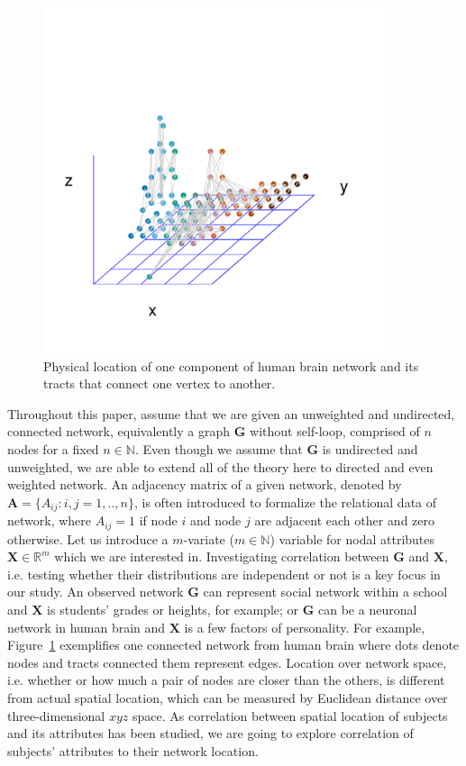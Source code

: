 \documentclass[12pt]{article}
\theoremstyle{definition}
\begin{document}
\begin{figure}[h]
	\centering
	\includegraphics[width=4in]{../Figure/intro.pdf}	
	\caption{Physical location of one component of human brain network and its tracts that connect one vertex to another.}
	\label{fig:intro}
\end{figure}

Throughout this paper, assume that we are given an unweighted and undirected, connected network, equivalently a graph $\mathbf{G}$ without self-loop, comprised of $n$ nodes for a fixed $n \in \mathbb{N}$. Even though we assume that $\mathbf{G}$ is undirected and unweighted, we are able to extend all of the theory here to directed and even weighted network. An adjacency matrix of a given network, denoted by $\mathbf{A} = \{A_{ij} : i,j= 1,..,n \}$, is often introduced to formalize the relational data of network, where $A_{ij} = 1$ if node $i$ and node $j$ are adjacent each other and zero otherwise. Let us introduce a $m$-variate ($m \in \mathbb{N}$) variable for nodal attributes $\mathbf{X}  \in \mathbb{R}^{m}$ which we are interested in. Investigating correlation between $\mathbf{G}$ and $\mathbf{X}$, i.e. testing whether their distributions are independent or not is a key focus in our study. An observed network $\mathbf{G}$ can represent social network within a school and $\mathbf{X}$ is students' grades or heights, for example; or $\mathbf{G}$ can be a neuronal network in human brain and $\mathbf{X}$ is a few factors of personality. For example, Figure~\ref{fig:intro} exemplifies one connected network from human brain where dots denote nodes and tracts connected them represent edges. Location over network space, i.e. whether or how much a pair of nodes are closer than the others, is different from actual spatial location, which can be measured by Euclidean distance over three-dimensional $xyz$ space. As correlation between spatial location of subjects and its attributes has been studied, we are going to explore correlation of subjects' attributes to their network location. 
	
\end{document}
